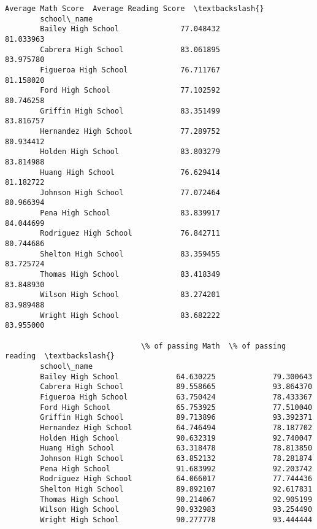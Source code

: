\documentclass[11pt]{article}
\begin{document}
\begin{Verbatim}[commandchars=\\\{\}]
                               Average Math Score  Average Reading Score  \textbackslash{}
        school\_name                                                        
        Bailey High School              77.048432              81.033963   
        Cabrera High School             83.061895              83.975780   
        Figueroa High School            76.711767              81.158020   
        Ford High School                77.102592              80.746258   
        Griffin High School             83.351499              83.816757   
        Hernandez High School           77.289752              80.934412   
        Holden High School              83.803279              83.814988   
        Huang High School               76.629414              81.182722   
        Johnson High School             77.072464              80.966394   
        Pena High School                83.839917              84.044699   
        Rodriguez High School           76.842711              80.744686   
        Shelton High School             83.359455              83.725724   
        Thomas High School              83.418349              83.848930   
        Wilson High School              83.274201              83.989488   
        Wright High School              83.682222              83.955000   
        
                               \% of passing Math  \% of passing reading  \textbackslash{}
        school\_name                                                      
        Bailey High School             64.630225             79.300643   
        Cabrera High School            89.558665             93.864370   
        Figueroa High School           63.750424             78.433367   
        Ford High School               65.753925             77.510040   
        Griffin High School            89.713896             93.392371   
        Hernandez High School          64.746494             78.187702   
        Holden High School             90.632319             92.740047   
        Huang High School              63.318478             78.813850   
        Johnson High School            63.852132             78.281874   
        Pena High School               91.683992             92.203742   
        Rodriguez High School          64.066017             77.744436   
        Shelton High School            89.892107             92.617831   
        Thomas High School             90.214067             92.905199   
        Wilson High School             90.932983             93.254490   
        Wright High School             90.277778             93.444444   
        

\end{Verbatim}
\end{document}
